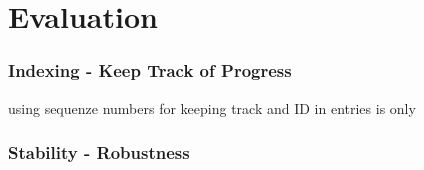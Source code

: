 \chapter{Evaluation}
\subsection{Indexing - Keep Track of Progress}
using sequenze numbers for keeping track and ID in entries is only 
\subsection{Stability - Robustness}